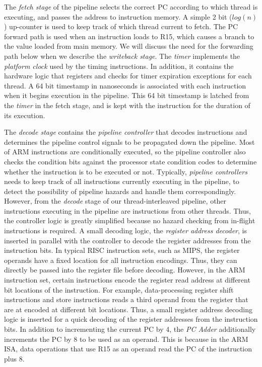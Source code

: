 The \emph{fetch stage} of the pipeline selects the correct PC according to which thread is executing, and passes the address to instruction memory. 
A simple 2 bit ($log(n)$) up-counter is used to keep track of which thread current to fetch.
The PC forward path is used when an instruction loads to R15, which causes a branch to the value loaded from main memory.  
We will discuss the need for the forwarding path below when we describe the \emph{writeback stage}.
The \emph{timer} implements the \emph{platform clock} used by the timing instructions.
In addition, it contains the hardware logic that registers and checks for timer expiration exceptions for each thread.
A 64 bit timestamp in nanoseconds is associated with each instruction when it begins execution in the pipeline.
This 64 bit timestamp is latched from the \emph{timer} in the fetch stage, and is kept with the instruction for the duration of its execution. 

The \emph{decode stage} contains the \emph{pipeline controller} that decodes instructions and determines the pipeline control signals to be propagated down the pipeline.
Most of ARM instructions are conditionally executed, so the pipeline controller also checks the condition bits against the processor state condition codes to determine whether the instruction is to be executed or not.  
Typically, \emph{pipeline controllers} needs to keep track of all instructions currently executing in the pipeline, to detect the possibility of pipeline hazards and handle them correspondingly.
However, from the \emph{decode} stage of our thread-interleaved pipeline, other instructions executing in the pipeline are instructions from other threads.
Thus, the controller logic is greatly simplified because no hazard checking from in-flight instructions is required.  
A small decoding logic, the \emph{register address decoder}, is inserted in parallel with the controller to decode the register addresses from the instruction bits.  
In typical RISC instruction sets, such as MIPS, the register operands have a fixed location for all instruction encodings.
Thus, they can directly be passed into the register file before decoding.   
However, in the ARM instruction set, certain instructions encode the register read address at different bit locations of the instruction.
For example, data-processing register shift instructions and store instructions reads a third operand from the register that are at encoded at different bit locations.
Thus, a small register address decoding logic is inserted for a quick decoding of the register addresses from the instruction bits.
In addition to incrementing the current PC by 4, the \emph{PC Adder} additionally increments the PC by 8 to be used as an operand.   
This is because in the ARM ISA, data operations that use R15 as an operand read the PC of the instruction plus 8.

